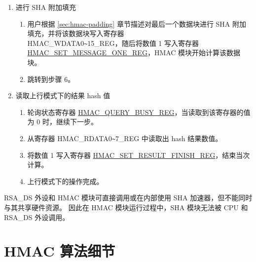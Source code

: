 \documentclass[main\_\_CN.tex]{subfiles}
\begin{document}
\begin{enumerate}
\begin{enumerate}
\begin{itemize}
\begin{enumerate}
                    \item 如果 Block\_\textcolor{red}{n} 既不是最后一个也不是倒数第二个数据块，将数值 1 写入寄存器 \\\hyperref[regdesc:HMACSETMESSAGEINGREG]{HMAC\_SET\_MESSAGE\_ING\_REG}，令$n=n+1$，随后跳转到步骤 4.(b)。
                \end{enumerate}
            \end{itemize}
        \end{enumerate}

    \item 进行 SHA 附加填充
    \begin{enumerate}
        \item 用户根据 \ref{sec:hmac-padding} 章节描述对最后一个数据块进行 SHA 附加填充，并将该数据块写入寄存器\\ HMAC\_WDATA0\verb+~+15\_REG，随后将数值 1 写入寄存器 \hyperref[regdesc:HMACSETMESSAGEONEREG]{HMAC\_SET\_MESSAGE\_ONE\_REG}，HMAC 模块开始计算该数据块。
        \item 跳转到步骤 6。
    \end{enumerate}

    \item 读取上行模式下的结果 hash 值
    \begin{enumerate}
        \item 轮询状态寄存器 \hyperref[regdesc:HMACQUERYBUSYREG]{HMAC\_QUERY\_BUSY\_REG}，当读取到该寄存器的值为 0 时，继续下一步。
        \item 从寄存器 HMAC\_RDATA0\verb+~+7\_REG 中读取出 hash 结果数值。
        \item 将数值 1 写入寄存器 \hyperref[regdesc:HMACSETRESULTFINISHREG]{HMAC\_SET\_RESULT\_FINISH\_REG}，结束当次计算。
        \item 上行模式下的操作完成。
    \end{enumerate}

\end{enumerate}

\begin{tiplisting}
\label{hmac_tips_2}
    RSA\_DS 外设和 HMAC 模块可直接调用或在内部使用 SHA 加速器，但不能同时与其共享硬件资源。
    因此在 HMAC 模块运行过程中，SHA 模块无法被 CPU 和 RSA\_DS 外设调用。
\end{tiplisting}

\section{HMAC 算法细节}
\end{document}
